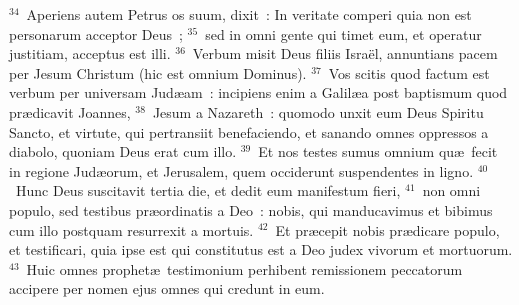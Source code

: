 ${}^{34}$~Aperiens autem Petrus os suum, dixit~: In veritate comperi quia non est personarum acceptor Deus~;
${}^{35}$~sed in omni gente qui timet eum, et operatur justitiam, acceptus est illi.
${}^{36}$~Verbum misit Deus filiis Isra\"el, annuntians pacem per Jesum Christum (hic est omnium Dominus).
${}^{37}$~Vos scitis quod factum est verbum per universam Jud\ae am~: incipiens enim a Galil\ae a post baptismum quod pr\ae dicavit Joannes,
${}^{38}$~Jesum a Nazareth~: quomodo unxit eum Deus Spiritu Sancto, et virtute, qui pertransiit benefaciendo, et sanando omnes oppressos a diabolo, quoniam Deus erat cum illo.
${}^{39}$~Et nos testes sumus omnium qu\ae\ fecit in regione Jud\ae orum, et Jerusalem, quem occiderunt suspendentes in ligno.
${}^{40}$~Hunc Deus suscitavit tertia die, et dedit eum manifestum fieri,
${}^{41}$~non omni populo, sed testibus pr\ae ordinatis a Deo~: nobis, qui manducavimus et bibimus cum illo postquam resurrexit a mortuis.
${}^{42}$~Et pr\ae cepit nobis pr\ae dicare populo, et testificari, quia ipse est qui constitutus est a Deo judex vivorum et mortuorum.
${}^{43}$~Huic omnes prophet\ae\ testimonium perhibent remissionem peccatorum accipere per nomen ejus omnes qui credunt in eum.


